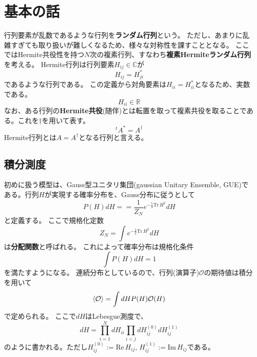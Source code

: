 \documentclass[10pt]{jsreport}
\theoremstyle{definition}%
\renewcommand{\Im}{\mathrm{Im\,}}
\renewcommand{\Re}{\mathrm{Re\,}}
\newcommand{\Tr}{\mathrm{Tr\,}}
\numberwithin{equation}{section}%
\begin{document}
\section{基本の話}
行列要素が乱数であるような行列を{\bf ランダム行列}という。
ただし、あまりに乱雑すぎても取り扱いが難しくなるため、様々な対称性を課すこととなる。
ここではHermite共役性を持つ$N$次の複素行列、すなわち{\bf 複素Hermiteランダム行列}を考える。
Hermite行列は行列要素$H_{ij}\in \mathbb{C}$が
\begin{equation}
  H_{ij}=H_{ji}^{*}
\end{equation}
であるような行列である。
この定義から対角要素は$H_{ii}=H_{ii}^{*}$となるため、実数である。
\begin{equation}
  H_{ii}\in \mathbb{R}
\end{equation}
なお、ある行列の{\bf Hermite共役}(随伴)とは転置を取って複素共役を取ることである。これを$\dagger$を用いて表す。
\begin{equation}
  {}^{t}\!A^{*}=A^{\dagger}
\end{equation}
Hermite行列とは$A=A^{\dagger}$となる行列と言える。
\subsection{積分測度}
初めに扱う模型は、Gauss型ユニタリ集団(gaussian Unitary Ensemble, GUE)である。行列$H$が実現する確率分布を、Gauss分布に従うとして
\begin{equation}
  P(H)dH==\frac{1}{Z_{N}}e^{-\frac{1}{2}\Tr H^{2}}dH
\end{equation}
と定義する。
ここで規格化定数
\begin{equation}
  Z_{N}=\int e^{-\frac{1}{2}\Tr H^{2}}dH
\end{equation}
は{\bf 分配関数}と呼ばれる。
これによって確率分布は規格化条件
\begin{equation}
  \int P(H)dH=1
\end{equation}
を満たすようになる。
連続分布としているので、行列(演算子)$\mathcal{O}$の期待値は積分を用いて
\begin{equation}
  \braket{\mathcal{O}}=\int dH P(H)\mathcal{O}(H)
\end{equation}
で定められる。
ここで$dH$はLebesgue測度で、
\begin{equation}
  dH=\prod_{i=1}^{N}dH_{ii}\prod_{i< j}dH_{ij}^{(0)}dH_{ij}^{(1)}
\end{equation}
のように書かれる。ただし$H_{ij}^{(0)}:=\Re H_{ij},\, H_{ij}^{(1)}:=\Im H_{ij}$である。
\end{document}
